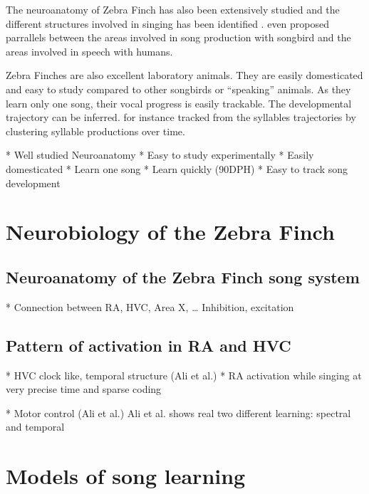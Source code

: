 \documentclass{report}
\begin{document}
The neuroanatomy of Zebra Finch has also been extensively studied and the
different structures involved in singing has been identified
\parencite{nottebohm_neural_2005, bertram_two_2014}.
\textcite{doupe_birdsong_1999} even proposed parrallels between the areas
involved in song production with songbird and the areas involved in speech with
humans.

Zebra Finches are also excellent laboratory animals. They are easily
domesticated and easy to study compared to other songbirds or ``speaking''
animals. As they learn only one song, their vocal
progress is easily trackable. The developmental trajectory can be inferred.
\textcite{deregnaucourt_how_2005} for instance tracked from the syllables
trajectories by clustering syllable productions over time.

  * Well studied Neuroanatomy
  * Easy to study experimentally
        * Easily domesticated
      * Learn one song
      * Learn quickly (90DPH)
      * Easy to track song development

\section{Neurobiology of the Zebra Finch}
\label{neurobiology-of-the-zebra-finch}

\subsection{Neuroanatomy of the Zebra Finch song system}
\label{neuroanatomy-of-the-zebra-finch-song-system}

  * Connection between RA, HVC, Area X, \ldots{} Inhibition, excitation

\subsection{Pattern of activation in RA and HVC}
\label{pattern-of-activation-in-ra-and-hvc}

  * HVC clock like, temporal structure (Ali et al.)
  * RA activation while singing at very precise time and sparse coding

        * Motor control (Ali et al.) Ali et al. shows real two different
    learning: spectral and temporal

\section{Models of song learning} \label{models-of-song-learning}
\end{document}
